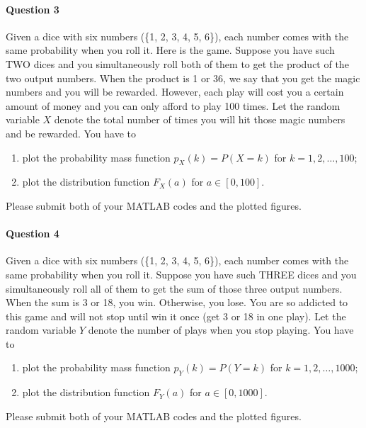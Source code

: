 \documentclass[11pt]{article} %
\begin{document}
\paragraph*{Question 3}
Given a dice with six numbers (\{1, 2, 3, 4, 5, 6\}), each number comes with the same probability when you roll it. Here is the game. Suppose you have such TWO dices and you simultaneously roll both of them to get the product of the two output numbers. When the product is 1 or 36, we say that you get the magic numbers and you will be rewarded. However, each play will cost you a certain amount of money and you can only afford to play 100 times. Let the random variable $X$ denote the total number of times you will hit those magic numbers and be rewarded. You have to
\begin{enumerate}
\item plot the probability mass function $p_X(k) = P(X = k)$ for $k = 1, 2, \ldots, 100$;
\item plot the distribution function $F_X(a)$ for $a \in [0, 100]$.
\end{enumerate}
Please submit both of your MATLAB codes and the plotted figures. 

\paragraph*{Question 4}
Given a dice with six numbers (\{1, 2, 3, 4, 5, 6\}), each number comes with the same probability when you roll it. Suppose you have such THREE dices and you simultaneously roll all of them to get the sum of those three output numbers. When the sum is 3 or 18, you win. Otherwise, you lose. You are so addicted to this game and will not stop until win it once (get 3 or 18 in one play). Let the random variable $Y$ denote the number of plays when you stop playing. You have to 
\begin{enumerate}
\item plot the probability mass function $p_Y(k) = P(Y = k)$ for $k = 1, 2, \ldots, 1000$; 
\item plot the distribution function $F_Y(a)$ for $a \in [0, 1000]$. 
\end{enumerate} 
Please submit both of your MATLAB codes and the plotted figures. 
\end{document}
